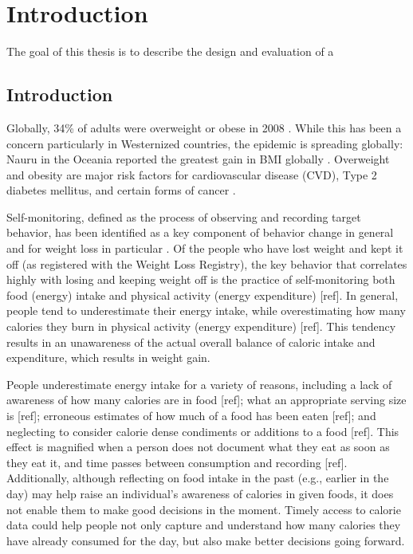 \chapter {Introduction}
The goal of this thesis is to describe the design and evaluation of a 

\section{Introduction}
Globally, 34\% of adults were overweight or obese in 2008 \citep{kimokoti_diet_2011}. While this has been a concern particularly in Westernized countries, the epidemic is spreading globally: Nauru in the Oceania reported the greatest gain in BMI globally \citep{finucane_national_2011}. Overweight and obesity are major risk factors for cardiovascular disease (CVD), Type 2 diabetes mellitus, and certain forms of cancer \citep{guh_incidence_2009} \citep{calle_overweight_2004}. 

Self-monitoring, defined as the process of observing and recording target behavior, has been identified as a key component of behavior change in general \citep{kanfer_self-monitoring:_1970} and for weight loss in particular \citep{michie_effective_2009} \citep{burke_effect_2011}. Of the people who have lost weight and kept it off (as registered with the Weight Loss Registry), the key behavior that correlates highly with losing and keeping weight off is the practice of self-monitoring both food (energy) intake and physical activity (energy expenditure) [ref]. In general, people tend to underestimate their energy intake, while overestimating how many calories they burn in physical activity (energy expenditure) [ref]. This tendency results in an unawareness of the actual overall balance of caloric intake and expenditure, which results in weight gain. 

People underestimate energy intake for a variety of reasons, including a lack of awareness of how many calories are in food [ref]; what an appropriate serving size is [ref]; erroneous estimates of how much of a food has been eaten [ref]; and neglecting to consider calorie dense condiments or additions to a food [ref]. This effect is magnified when a person does not document what they eat as soon as they eat it, and time passes between consumption and recording [ref]. Additionally, although reflecting on food intake in the past (e.g., earlier in the day) may help raise an individual's awareness of calories in given foods, it does not enable them to make good decisions in the moment. Timely access to calorie data could help people not only capture and understand how many calories they have already consumed for the day, but also make better decisions going forward. 

